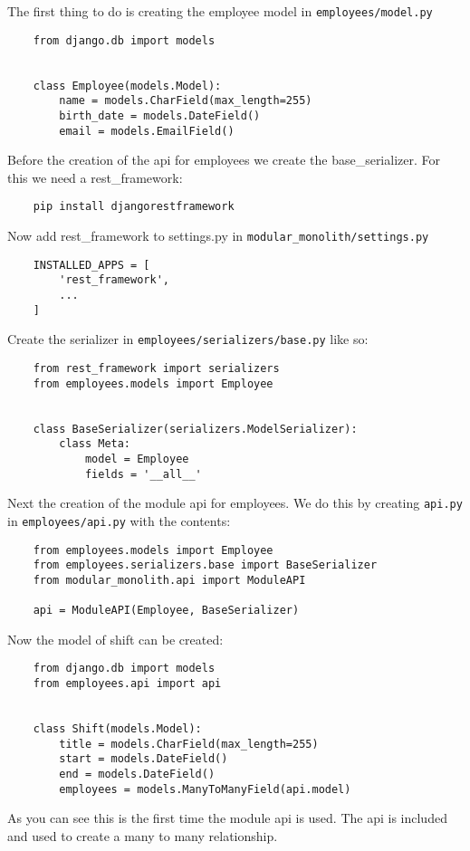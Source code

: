The first thing to do is creating the employee model in \texttt{employees/model.py}
\begin{verbatim}
    from django.db import models


    class Employee(models.Model):
        name = models.CharField(max_length=255)
        birth_date = models.DateField()
        email = models.EmailField()
\end{verbatim}

Before the creation of the api for employees we create the base\_serializer. For this we need a rest\_framework:
\begin{verbatim}
    pip install djangorestframework
\end{verbatim}

Now add rest\_framework to settings.py in \texttt{modular\_monolith/settings.py}
\begin{verbatim}
    INSTALLED_APPS = [
        'rest_framework',
        ...
    ]
\end{verbatim}

Create the serializer in \texttt{employees/serializers/base.py} like so:
\begin{verbatim}
    from rest_framework import serializers
    from employees.models import Employee


    class BaseSerializer(serializers.ModelSerializer):
        class Meta:
            model = Employee
            fields = '__all__'
\end{verbatim}

Next the creation of the module api for employees. We do this by creating \texttt{api.py} in \texttt{employees/api.py} with the contents:
\begin{verbatim}
    from employees.models import Employee
    from employees.serializers.base import BaseSerializer
    from modular_monolith.api import ModuleAPI

    api = ModuleAPI(Employee, BaseSerializer)
\end{verbatim}

Now the model of shift can be created:
\begin{verbatim}
    from django.db import models
    from employees.api import api


    class Shift(models.Model):
        title = models.CharField(max_length=255)
        start = models.DateField()
        end = models.DateField()
        employees = models.ManyToManyField(api.model)
\end{verbatim}

As you can see this is the first time the module api is used. The api is included and used to create a many to many relationship.

